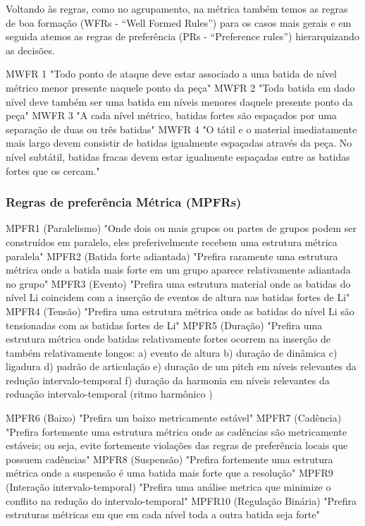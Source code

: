 \documentclass[
	12pt,				%
	openright,			%
	twoside,			%
	a4paper,			%
	english,			%
	french,				%
	spanish,			%
	brazil				%
	]{abntex2}
\begin{document}
Voltando às regras, como no agrupamento, na métrica também temos as regras de boa formação (WFRs - “Well Formed Rules”) para os casos mais gerais e em seguida atemos as regras de preferência (PRs - “Preference rules”) hierarquizando as decisões.

\begin{citacao}
MWFR 1 "Todo ponto de ataque deve estar associado a uma batida de nível métrico menor presente naquele ponto da peça" 
MWFR 2 "Toda batida em dado nível deve também ser uma batida em níveis menores daquele presente ponto da peça" 
MWFR 3 "A cada nível métrico, batidas fortes são espaçados por uma separação de duas ou três batidas" 
MWFR 4 "O tátil e o material imediatamente mais largo devem consistir de batidas igualmente espaçadas através da peça. No nível subtátil, batidas fracas devem estar igualmente espaçadas entre as batidas fortes que os cercam." 
 \cite{lerdahl1983generative}
\end{citacao} 

\subsubsection{Regras de preferência Métrica (MPFRs) } 

\begin{citacao}
MPFR1 (Paralelismo) "Onde dois ou mais grupos ou partes de grupos podem ser construídos em paralelo, eles preferivelmente recebem uma estrutura métrica paralela" 
MPFR2 (Batida forte adiantada) "Prefira raramente uma estrutura métrica onde a batida mais forte em um grupo aparece relativamente adiantada no grupo" 
MPFR3 (Evento) "Prefira uma estrutura material onde as batidas do nível Li coincidem com a inserção de eventos de altura nas batidas fortes de Li" 
MPFR4 (Tensão) "Prefira uma estrutura métrica onde as batidas do nível Li são tensionadas com as batidas fortes de Li" 
MPFR5 (Duração) "Prefira uma estrutura métrica onde batidas relativamente fortes ocorrem na inserção de também relativamente longos: 
a) evento de altura 
b) duração de dinâmica 
c) ligadura 
d) padrão de articulação 
e) duração de um pitch em níveis relevantes da redução intervalo-temporal 
f) duração da harmonia em níveis relevantes  da reduação intervalo-temporal (ritmo harmônico )

MPFR6 (Baixo) "Prefira um baixo metricamente estável" 
MPFR7 (Cadência) "Prefira fortemente uma estrutura métrica onde as cadências são metricamente estáveis; ou seja, evite fortemente violações das regras de preferência locais que possuem cadências" 
MPFR8 (Suspensão) "Prefira fortemente uma estrutura métrica onde a suspensão é uma batida mais forte que a resolução" 
MPFR9 (Interação intervalo-temporal) "Prefira uma análise metrica que minimize o conflito na redução do intervalo-temporal" 
MPFR10 (Regulação Binária) "Prefira estruturas métricas em que em cada nível toda a outra batida seja forte" 
 \cite{lerdahl1983generative}
\end{citacao}
\end{document}
